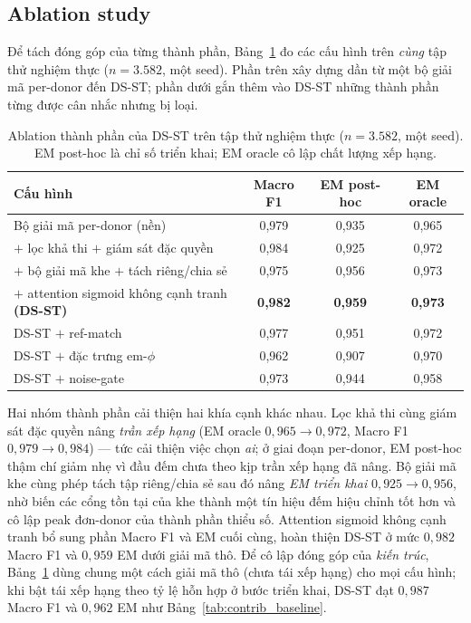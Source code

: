 \documentclass[12pt,a4paper]{article}
\begin{document}
\subsection{Ablation study}

Để tách đóng góp của từng thành phần, Bảng~\ref{tab:ablation} đo các cấu hình trên \emph{cùng} tập thử nghiệm thực (\(n=3.582\), một seed). Phần trên xây dựng dần từ một bộ giải mã per-donor đến DS-ST; phần dưới gắn thêm vào DS-ST những thành phần từng được cân nhắc nhưng bị loại.

\begin{table}[H]
\centering
\caption{Ablation thành phần của DS-ST trên tập thử nghiệm thực (\(n=3.582\), một seed). EM post-hoc là chỉ số triển khai; EM oracle cô lập chất lượng xếp hạng.}
\label{tab:ablation}
\small
\begin{tabular}{lccc}
\toprule
\textbf{Cấu hình} & \textbf{Macro F1} & \textbf{EM post-hoc} & \textbf{EM oracle} \\
\midrule
Bộ giải mã per-donor (nền) & 0,979 & 0,935 & 0,965 \\
\;\(+\) lọc khả thi \(+\) giám sát đặc quyền & 0,984 & 0,925 & 0,972 \\
\;\(+\) bộ giải mã khe \(+\) tách riêng/chia sẻ & 0,975 & 0,956 & 0,973 \\
\;\(+\) attention sigmoid không cạnh tranh \textbf{(DS-ST)} & \textbf{0,982} & \textbf{0,959} & \textbf{0,973} \\
\midrule
DS-ST \(+\) ref-match & 0,977 & 0,951 & 0,972 \\
DS-ST \(+\) đặc trưng em-\(\phi\) & 0,962 & 0,907 & 0,970 \\
DS-ST \(+\) noise-gate & 0,973 & 0,944 & 0,958 \\
\bottomrule
\end{tabular}
\end{table}

Hai nhóm thành phần cải thiện hai khía cạnh khác nhau. Lọc khả thi cùng giám sát đặc quyền nâng \emph{trần xếp hạng} (EM oracle \(0,965\rightarrow0,972\), Macro F1 \(0,979\rightarrow0,984\)) — tức cải thiện việc chọn \emph{ai}; ở giai đoạn per-donor, EM post-hoc thậm chí giảm nhẹ vì đầu đếm chưa theo kịp trần xếp hạng đã nâng. Bộ giải mã khe cùng phép tách tập riêng/chia sẻ sau đó nâng \emph{EM triển khai} \(0,925\rightarrow0,956\), nhờ biến các cổng tồn tại của khe thành một tín hiệu đếm hiệu chỉnh tốt hơn và cô lập peak đơn-donor của thành phần thiểu số. Attention sigmoid không cạnh tranh bổ sung phần Macro F1 và EM cuối cùng, hoàn thiện DS-ST ở mức \(0,982\) Macro F1 và \(0,959\) EM dưới giải mã thô. Để cô lập đóng góp của \emph{kiến trúc}, Bảng~\ref{tab:ablation} dùng chung một cách giải mã thô (chưa tái xếp hạng) cho mọi cấu hình; khi bật tái xếp hạng theo tỷ lệ hỗn hợp ở bước triển khai, DS-ST đạt \(0,987\) Macro F1 và \(0,962\) EM như Bảng~\ref{tab:contrib_baseline}.
\end{document}
